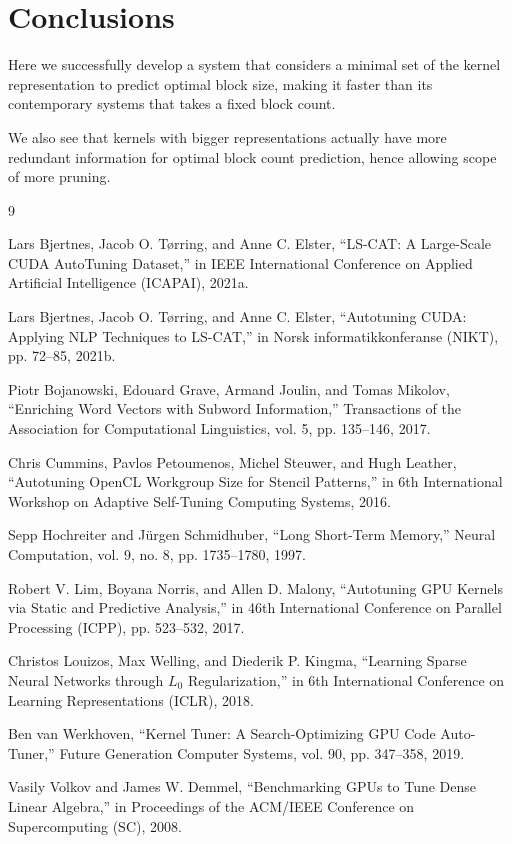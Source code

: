 \documentclass[11pt,letterpaper]{article}
\begin{document}
\section{Conclusions}
Here we successfully develop a system that considers a minimal set of the kernel representation to predict optimal block size, making it faster than its contemporary systems that takes a fixed block count.
    
We also see that kernels with bigger representations actually have more redundant information for optimal block count prediction, hence allowing scope of more pruning.

\begin{thebibliography}{9}
\small

Lars Bjertnes, Jacob O. Tørring, and Anne C. Elster, ``LS-CAT: A Large-Scale CUDA AutoTuning Dataset,'' in
IEEE International Conference on Applied Artificial Intelligence (ICAPAI), 2021a.

Lars Bjertnes, Jacob O. Tørring, and Anne C. Elster, ``Autotuning CUDA: Applying NLP Techniques to LS-CAT,''
in Norsk informatikkonferanse (NIKT), pp. 72--85, 2021b.

Piotr Bojanowski, Edouard Grave, Armand Joulin, and Tomas Mikolov, ``Enriching Word Vectors with Subword
Information,'' Transactions of the Association for Computational Linguistics, vol. 5, pp. 135--146, 2017.

Chris Cummins, Pavlos Petoumenos, Michel Steuwer, and Hugh Leather, ``Autotuning OpenCL Workgroup Size for
Stencil Patterns,'' in 6th International Workshop on Adaptive Self-Tuning Computing Systems, 2016.

Sepp Hochreiter and Jürgen Schmidhuber, ``Long Short-Term Memory,'' Neural Computation, vol. 9, no. 8, pp.
1735--1780, 1997.

Robert V. Lim, Boyana Norris, and Allen D. Malony, ``Autotuning GPU Kernels via Static and Predictive
Analysis,'' in 46th International Conference on Parallel Processing (ICPP), pp. 523--532, 2017.

Christos Louizos, Max Welling, and Diederik P. Kingma, ``Learning Sparse Neural Networks through \(L_0\)
Regularization,'' in 6th International Conference on Learning Representations (ICLR), 2018.

Ben van Werkhoven, ``Kernel Tuner: A Search-Optimizing GPU Code Auto-Tuner,'' Future Generation Computer
Systems, vol. 90, pp. 347--358, 2019.

Vasily Volkov and James W. Demmel, ``Benchmarking GPUs to Tune Dense Linear Algebra,'' in Proceedings of the
ACM/IEEE Conference on Supercomputing (SC), 2008.

\end{thebibliography}
\end{document}
